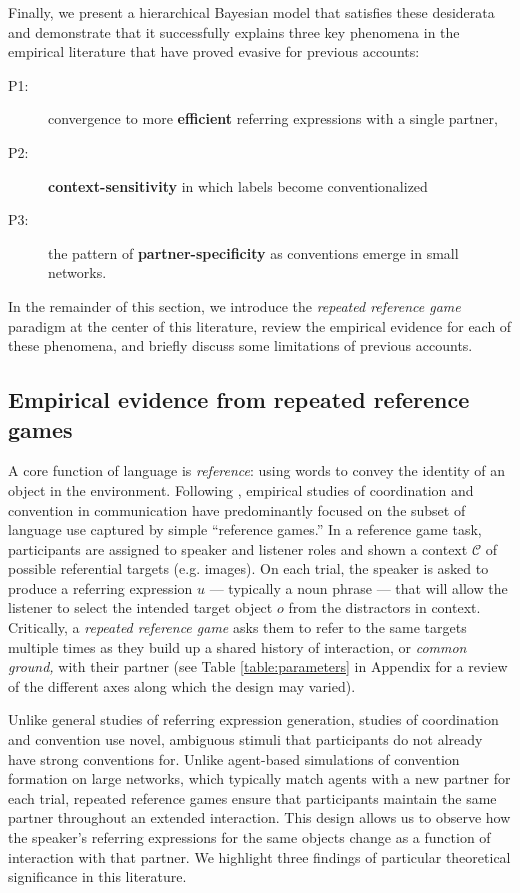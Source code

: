 Finally, we present a hierarchical Bayesian model that satisfies these desiderata and demonstrate that it successfully explains three key phenomena in the empirical literature that have proved evasive for previous accounts: 
\begin{description}
\item[P1:] convergence to more \textbf{efficient} referring expressions with a single partner, 
\item[P2:] \textbf{context-sensitivity} in which labels become conventionalized
\item[P3:] the pattern of \textbf{partner-specificity} as conventions emerge in small networks.
\end{description}
In the remainder of this section, we introduce the \emph{repeated reference game} paradigm at the center of this literature, review the empirical evidence for each of these phenomena, and briefly discuss some limitations of previous accounts.

\subsection{Empirical evidence from repeated reference games}

A core function of language is \emph{reference}: using words to convey the identity of an object in the environment. 
Following , empirical studies of coordination and convention in communication have predominantly focused on the subset of language use captured by simple ``reference games.'' 
In a reference game task, participants are assigned to speaker and listener roles and shown a context $\mathcal{C}$ of possible referential targets (e.g. images).
On each trial, the speaker is asked to produce a referring expression $u$ --- typically a noun phrase --- that will allow the listener to select the intended target object $o$ from the distractors in context.
Critically, a \emph{repeated reference game} asks them to refer to the same targets multiple times as they build up a shared history of interaction, or \emph{common ground,} with their partner (see Table \ref{table:parameters} in Appendix for a review of the different axes along which the design may varied).

Unlike general studies of referring expression generation, studies of coordination and convention use novel, ambiguous stimuli that participants do not already have strong conventions for.
Unlike agent-based simulations of convention formation on large networks, which typically match agents with a new partner for each trial, repeated reference games ensure that participants maintain the same partner throughout an extended interaction.
This design allows us to observe how the speaker's referring expressions for the same objects change as a function of interaction with that partner.
We highlight three findings of particular theoretical significance in this literature.

